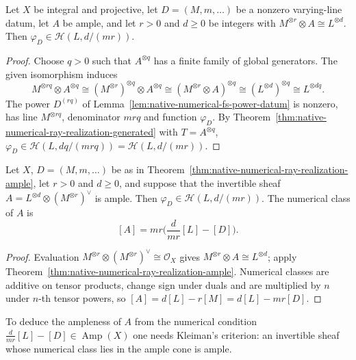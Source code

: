 \begin{theorem}
\label{thm:native-numerical-ray-realization-ample}
\leanok
{}
Let $X$ be integral and projective, let $D=(M,m,\dots)$ be a nonzero
varying-line datum, let $A$ be ample, and let $r>0$ and $d\ge0$ be integers
with $M^{\otimes r}\otimes A\cong L^{\otimes d}$.  Then
$\varphi_D\in\mathcal H(L,d/(mr))$.
\end{theorem}
\begin{proof}
Choose $q>0$ such that $A^{\otimes q}$ has a finite family of global
generators.  The given isomorphism induces
\[
 M^{\otimes rq}\otimes A^{\otimes q}\cong(M^{\otimes r})^{\otimes q}\otimes A^{\otimes q}
 \cong(M^{\otimes r}\otimes A)^{\otimes q}\cong(L^{\otimes d})^{\otimes q}\cong L^{\otimes dq}.
\]
The power $D^{(rq)}$ of Lemma~\ref{lem:native-numerical-fs-power-datum} is
nonzero, has line $M^{\otimes rq}$, denominator $mrq$ and function
$\varphi_D$.  By Theorem~\ref{thm:native-numerical-ray-realization-generated}
with $T=A^{\otimes q}$, $\varphi_D\in\mathcal H(L,dq/(mrq))=\mathcal H(L,d/(mr))$.
\end{proof}

\begin{corollary}
\label{cor:native-numerical-ray-realization-difference}
\leanok
{}
Let $X$, $D=(M,m,\dots)$ be as in
Theorem~\ref{thm:native-numerical-ray-realization-ample}, let $r>0$ and $d\ge0$,
and suppose that the invertible sheaf
$A=L^{\otimes d}\otimes(M^{\otimes r})^\vee$ is ample.  Then
$\varphi_D\in\mathcal H(L,d/(mr))$.  The numerical class of $A$ is
\[
 [A]=mr\Big(\frac{d}{mr}[L]-[D]\Big).
\]
\end{corollary}
\begin{proof}
Evaluation $M^{\otimes r}\otimes(M^{\otimes r})^\vee\cong\mathcal O_X$ gives
$M^{\otimes r}\otimes A\cong L^{\otimes d}$; apply
Theorem~\ref{thm:native-numerical-ray-realization-ample}.  Numerical classes
are additive on tensor products, change sign under duals and are multiplied
by $n$ under $n$-th tensor powers, so $[A]=d[L]-r[M]=d[L]-mr[D]$.
\end{proof}

\begin{remark}
To deduce the ampleness of $A$ from the numerical condition
$\frac{d}{mr}[L]-[D]\in\operatorname{Amp}(X)$ one needs Kleiman's criterion:
an invertible sheaf whose numerical class lies in the ample cone is ample.
\end{remark}
